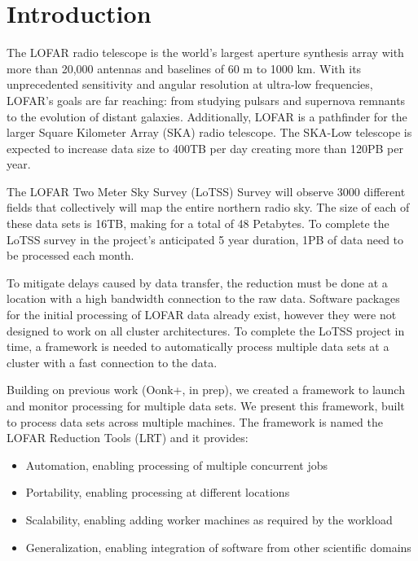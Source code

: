 % 
\setcounter{footnote}{0}

\section{Introduction}
The LOFAR radio telescope is the world's largest aperture synthesis array with more than 20,000 antennas and baselines of 60 m to 1000 km\cite{van2013lofar}. With its unprecedented sensitivity and angular resolution at ultra-low frequencies, LOFAR's goals are far reaching: from studying pulsars and supernova remnants to the evolution of distant galaxies. Additionally, LOFAR is a pathfinder for the larger Square Kilometer Array (SKA) radio telescope. The SKA-Low telescope is expected to increase data size\cite{lofar_data} to 400TB per day creating more than 120PB per year\cite{ska_cloud_memo}. 

The LOFAR Two Meter Sky Survey (LoTSS) Survey\cite{lotss} will observe 3000 different fields that collectively will map the entire northern radio sky. The size of each of these data sets is 16TB, making for a total of 48 Petabytes. To complete the LoTSS survey in the project's anticipated 5 year duration, 1PB of data need to be processed each month. 

To mitigate delays caused by data transfer, the reduction must be done at a location with a high bandwidth connection to the raw data. Software packages for the initial processing of LOFAR data already exist\cite{van2016lofar}, however they were not designed to work on all cluster architectures. To complete the LoTSS project in time, a framework is needed to automatically process multiple data sets at a cluster with a fast connection to the data. 

Building on previous work (Oonk+, in prep), we created a framework to launch and monitor processing for multiple data sets. We present this framework, built to process data sets across multiple machines. The framework is named the LOFAR Reduction Tools (LRT) and it provides:

\begin{itemize}[noitemsep,topsep=0pt]
 \item Automation, enabling processing of multiple concurrent jobs
 \item Portability, enabling processing at different locations 
 \item Scalability, enabling adding worker machines as required by the workload
 \item Generalization, enabling integration of software from other scientific domains
\end{itemize}

